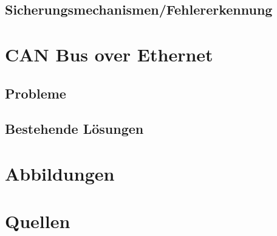 	\subsection{Sicherungsmechanismen/Fehlererkennung}

\section{CAN Bus over Ethernet}
	
	\subsection{Probleme}
	
	\subsection{Bestehende Lösungen}

\section{Abbildungen}

\section{Quellen}